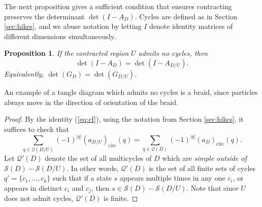 \documentclass[11pt,hyp,]{nyjm}
\numberwithin{thm}{section}
\newtheorem{prop}[thm]{Proposition}
\theoremstyle{definition}
\theoremstyle{remark}
\begin{document}
	The next proposition gives a sufficient condition that ensures contracting preserves the determinant $\det(I - A_D)$. Cycles are defined as in Section \ref{sec:hikes}, and we abuse notation by letting $I$ denote identity matrices of different dimensions simultaneously.
	
	\begin{prop}
		\label{thm:cmc_det}
		If the contracted region $U$ admits no cycles, then
		$$
		\det(I - A_D) = \det(I - A_{D/U}).
		$$
		Equivalently, $\det(G_D) = \det(G_{D/U})$.
	\end{prop}

	An example of a tangle diagram which admits no cycles is a braid, since particles always move in the direction of orientation of the braid.

	\begin{proof}
		By the identity (\ref{eq:cf}), using the notation from Section \ref{sec:hikes}, it suffices to check that
		$$
		\sum_{q \in \mathcal{Q}(D/U)} (-1)^{|q|}(a_{D/U})_\text{circ}(q) = \sum_{q \in \mathcal{Q}(D)} (-1)^{|q|}(a_D)_\text{circ}(q).
		$$
		Let $\mathcal{Q}'(D)$ denote the set of all multicycles of $D$ which are {\em simple outside of $\mathcal{S}(D) - \mathcal{S}(D/U)$}. In other words, $\mathcal{Q}'(D)$ is the set of all finite sets of cycles $q' = \{c_1, \dots, c_k\}$ such that if a state $s$ appears multiple times in any one $c_i$, or appears in distinct $c_i$ and $c_j$, then $s \in \mathcal{S}(D) - \mathcal{S}(D/U)$. Note that since $U$ does not admit cycles, $\mathcal{Q}'(D)$ is finite.
		

\end{proof}
\end{document}
